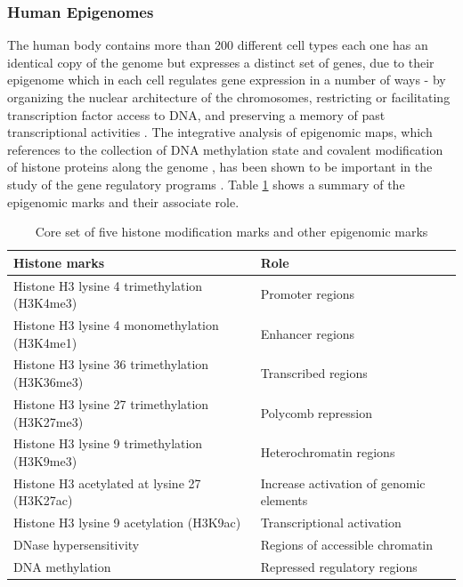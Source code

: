 \subsubsection{Human Epigenomes}
The human body contains  more than 200 different cell types
each one has an identical copy of the genome but expresses a distinct set of genes, due to their epigenome which in each cell regulates gene expression in a number of ways - by organizing the nuclear architecture of the chromosomes, restricting or facilitating transcription factor access to DNA, and preserving a memory of past transcriptional activities \cite{rivera2013mapping}.
The integrative analysis of epigenomic maps, which references to the collection of DNA methylation state and covalent modification of histone proteins along the genome \cite{bonasio2010molecular}, has been shown to be important in the study of the gene regulatory programs \cite{gifford2013transcriptional,hawkins2010distinct,rada2012epigenomic}. Table \ref{histonemarks}
shows a summary of the epigenomic marks and their associate role.

\begin{landscape}


\bgroup
\def\arraystretch{2.0}%
\begin{table}[]
\centering
\small
\caption[Histone and epigenomic marks]{Core set of five histone modification marks and other epigenomic marks}
\label{histonemarks}
\begin{tabular}{lp{14cm}}
\toprule
\toprule
 \textbf{Histone marks}   & \textbf{Role} \\ \toprule \toprule
 Histone H3 lysine 4 trimethylation (H3K4me3)  & Promoter regions \cite{heintzman2007distinct,bernstein2005genomic} \\
 Histone H3 lysine 4 monomethylation (H3K4me1) & Enhancer regions \cite{heintzman2007distinct}  \\
 Histone H3 lysine 36 trimethylation (H3K36me3) & Transcribed regions  \\
 Histone H3 lysine 27 trimethylation (H3K27me3) & Polycomb repression \cite{bonasio2010molecular}  \\
 Histone H3 lysine 9 trimethylation (H3K9me3) & Heterochromatin regions \cite{peters2003partitioning} \\
 Histone H3 acetylated at lysine 27 (H3K27ac)  &  Increase activation of genomic elements \cite{heintzman2009histone,rada2011unique,creyghton2010histone} \\
 Histone H3 lysine 9 acetylation  (H3K9ac)  & Transcriptional activation \cite{nishida2006histone} \\
 DNase hypersensitivity &  Regions of accessible chromatin \cite{thurman2012accessible}\\
 DNA methylation & Repressed regulatory regions \cite{cedar2009linking,moore2013dna}\\  \bottomrule
\end{tabular}
\end{table}
\egroup
\end{landscape}

